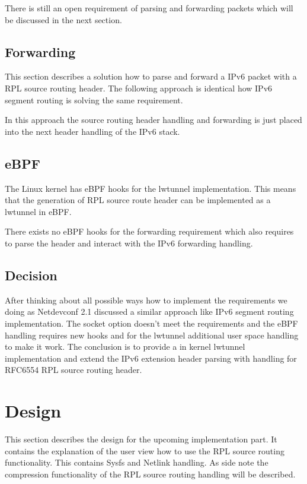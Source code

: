 \documentclass[letterpaper]{article}
\begin{document}
There is still an open requirement of parsing and forwarding packets which will be discussed in the next section.

\subsection{Forwarding}

This section describes a solution how to parse and forward a IPv6 packet with a RPL source routing header.
The following approach is identical how IPv6 segment routing \cite{srh} is solving the same requirement.

In this approach the source routing header handling and forwarding is just placed into the next header handling of the IPv6 stack.

\subsection{eBPF}

The Linux kernel has eBPF hooks for the lwtunnel implementation.
This means that the generation of RPL source route header can be implemented as a lwtunnel in eBPF.

There exists no eBPF hooks for the forwarding requirement which also requires to parse the header and interact with the IPv6 forwarding handling.

\subsection{Decision}

After thinking about all possible ways how to implement the requirements we doing as Netdevconf 2.1 discussed a similar approach like IPv6 segment routing implementation.
The socket option doesn't meet the requirements and the eBPF handling requires new hooks and for the lwtunnel additional user space handling to make it work.
The conclusion is to provide a in kernel lwtunnel implementation and extend the IPv6 extension header parsing with handling for RFC6554 RPL source routing header.

\section{Design}

This section describes the design for the upcoming implementation part.
It contains the explanation of the user view how to use the RPL source routing functionality.
This contains Sysfs and Netlink handling.
As side note the compression functionality of the RPL source routing handling will be described.
\end{document}
